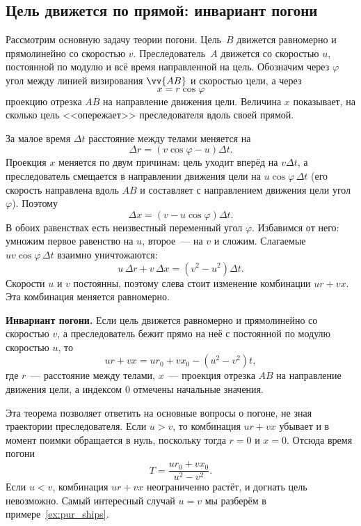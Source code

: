 \documentclass[../main.tex]{subfiles}
\begin{document}
\subsection{Цель движется по прямой: инвариант погони}

Рассмотрим основную задачу теории погони. Цель~$B$ движется равномерно и
прямолинейно со скоростью $v$. Преследователь~$A$ движется со скоростью $u$,
постоянной по модулю и всё время направленной на цель. Обозначим через $\varphi$
угол между линией визирования $\vv{AB}$ и скоростью цели, а через
\[
x = r\cos\varphi
\]
проекцию отрезка $AB$ на направление движения цели. Величина $x$ показывает, на
сколько цель <<опережает>> преследователя вдоль своей прямой.

За малое время $\Delta t$ расстояние между телами меняется на
\[
\Delta r = (v\cos\varphi - u)\Delta t.
\]
Проекция $x$ меняется по двум причинам: цель уходит вперёд на $v\Delta t$, а
преследователь смещается в направлении движения цели на $u\cos\varphi\,\Delta t$
(его скорость направлена вдоль $AB$ и составляет с направлением движения цели угол
$\varphi$). Поэтому
\[
\Delta x = (v - u\cos\varphi)\Delta t.
\]
В обоих равенствах есть неизвестный переменный угол $\varphi$. Избавимся от него:
умножим первое равенство на $u$, второе~--- на $v$ и сложим. Слагаемые
$uv\cos\varphi\,\Delta t$ взаимно уничтожаются:
\[
u\,\Delta r + v\,\Delta x = (v^2 - u^2)\Delta t.
\]
Скорости $u$ и $v$ постоянны, поэтому слева стоит изменение комбинации $ur + vx$.
Эта комбинация меняется равномерно.

\begin{theorem}
\textbf{Инвариант погони.} Если цель движется равномерно и прямолинейно со
скоростью $v$, а преследователь бежит прямо на неё с постоянной по модулю скоростью
$u$, то
\[
ur + vx = ur_0 + vx_0 - (u^2 - v^2)t,
\]
где $r$~--- расстояние между телами, $x$~--- проекция отрезка $AB$ на направление
движения цели, а индексом $0$ отмечены начальные значения.
\end{theorem}

Эта теорема позволяет ответить на основные вопросы о погоне, не зная траектории
преследователя. Если $u > v$, то комбинация $ur + vx$ убывает и в момент поимки
обращается в нуль, поскольку тогда $r = 0$ и $x = 0$. Отсюда время погони
\[
T = \frac{ur_0 + vx_0}{u^2 - v^2}.
\]
Если $u < v$, комбинация $ur + vx$ неограниченно растёт, и догнать цель невозможно.
Самый интересный случай $u = v$ мы разберём в примере~\ref{ex:pur_ships}.
\end{document}
